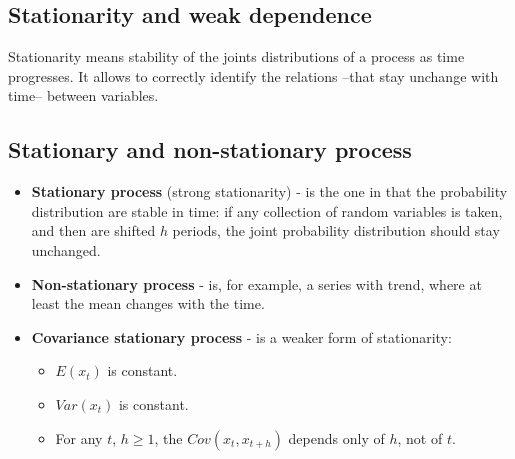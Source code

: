 \documentclass[10pt, a4paper, landscape]{extarticle}
\begin{document}
\begin{multicols}{3}
\section*{Stationarity and weak dependence}
	Stationarity means stability of the joints distributions of a process as time progresses. It allows to correctly identify the relations --that stay unchange with time-- between variables.
	\subsection*{Stationary and non-stationary process}
		\begin{itemize}[leftmargin=*]
			\item \textbf{Stationary process} (strong stationarity) - is the one in that the probability distribution are stable in time: if any collection of random variables is taken, and then are shifted $h$ periods, the joint probability distribution should stay unchanged.

\columnbreak

			\item \textbf{Non-stationary process} - is, for example, a series with trend, where at least the mean changes with the time.
			\item \textbf{Covariance stationary process} - is a weaker form of stationarity:
			\begin{itemize}[leftmargin=*]
				\item $E(x_t)$ is constant.
				\item $Var(x_t)$ is constant.
				\item For any $t$,  $h \geq 1$, the $Cov(x_t, x_{t+h})$ depends only of $h$, not of $t$.
			\end{itemize}
		\end{itemize}

\end{multicols}
\end{document}
